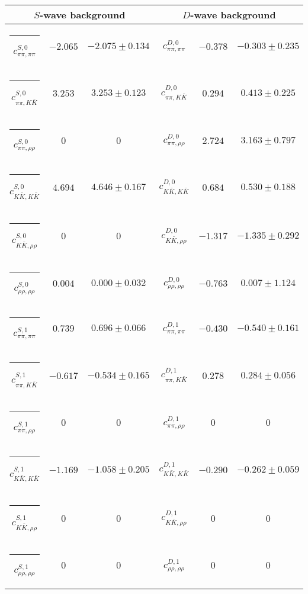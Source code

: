 \begin{table}[h]
\begin{ruledtabular}
\begin{tabular}{c c c c c c c c c}
\end{tabular}
\vspace{2em}
\begin{tabular}{c c c c c c}
\multicolumn{3}{c}{$S$-wave background}  & \multicolumn{3}{c}{$D$-wave background} \\ \hline
\rule[-0.2cm]{-0.1cm}{.55cm} $c^{S,0}_{\pi\pi,\pi\pi}$ &$-2.065$ & $-2.075 \pm 0.134$ & $c^{D,0}_{\pi\pi,\pi\pi}$ &$-0.378$ & $-0.303 \pm 0.235$ \\
\rule[-0.2cm]{-0.1cm}{.55cm} $c^{S,0}_{\pi\pi,K\bar K}$ &$3.253$ & $3.253 \pm 0.123$ & $c^{D,0}_{\pi\pi,K\bar K}$ &$0.294$ & $0.413 \pm 0.225$ \\
\rule[-0.2cm]{-0.1cm}{.55cm} $c^{S,0}_{\pi\pi,\rho\rho}$ &$0$ & $0$ & $c^{D,0}_{\pi\pi,\rho\rho}$ &$2.724$ & $3.163 \pm 0.797$ \\
\rule[-0.2cm]{-0.1cm}{.55cm} $c^{S,0}_{K\bar K,K\bar K}$ &$4.694$ & $4.646 \pm 0.167$ & $c^{D,0}_{K\bar K,K\bar K}$ &$0.684$ & $0.530 \pm 0.188$ \\
\rule[-0.2cm]{-0.1cm}{.55cm} $c^{S,0}_{K\bar K,\rho\rho}$ &$0$ & $0$ & $c^{D,0}_{K\bar K,\rho\rho}$ &$-1.317$ & $-1.335 \pm 0.292$ \\
\rule[-0.2cm]{-0.1cm}{.55cm} $c^{S,0}_{\rho\rho,\rho\rho}$ &$0.004$ & $0.000 \pm 0.032$ & $c^{D,0}_{\rho\rho,\rho\rho}$ &$-0.763$ & $0.007 \pm 1.124$ \\
\rule[-0.2cm]{-0.1cm}{.55cm} $c^{S,1}_{\pi\pi,\pi\pi}$ &$0.739$ & $0.696 \pm 0.066$ & $c^{D,1}_{\pi\pi,\pi\pi}$ &$-0.430$ & $-0.540 \pm 0.161$ \\
\rule[-0.2cm]{-0.1cm}{.55cm} $c^{S,1}_{\pi\pi,K\bar K}$ &$-0.617$ & $-0.534 \pm 0.165$ & $c^{D,1}_{\pi\pi,K\bar K}$ &$0.278$ & $0.284 \pm 0.056$ \\
\rule[-0.2cm]{-0.1cm}{.55cm} $c^{S,1}_{\pi\pi,\rho\rho}$ &$0$ & $0$ & $c^{D,1}_{\pi\pi,\rho\rho}$ &$0$ & $0$ \\
\rule[-0.2cm]{-0.1cm}{.55cm} $c^{S,1}_{K\bar K,K\bar K}$ &$-1.169$ & $-1.058 \pm 0.205$ & $c^{D,1}_{K\bar K,K\bar K}$ &$-0.290$ & $-0.262 \pm 0.059$ \\
\rule[-0.2cm]{-0.1cm}{.55cm} $c^{S,1}_{K\bar K,\rho\rho}$ &$0$ & $0$ & $c^{D,1}_{K\bar K,\rho\rho}$ &$0$ & $0$ \\
\rule[-0.2cm]{-0.1cm}{.55cm} $c^{S,1}_{\rho\rho,\rho\rho}$ &$0$ & $0$ & $c^{D,1}_{\rho\rho,\rho\rho}$ &$0$ & $0$ \\
\end{tabular}
\end{ruledtabular}
\end{table}
